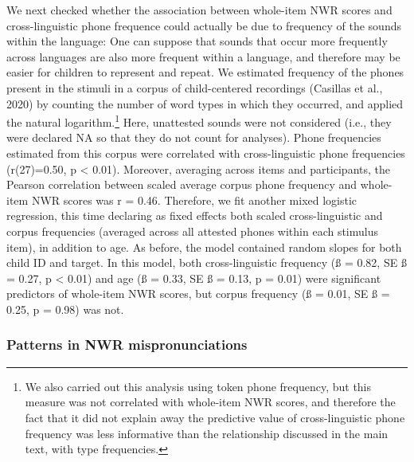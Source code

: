 \documentclass[english,,man,floatsintext]{apa6}
\begin{document}
We next checked whether the association between whole-item NWR scores and cross-linguistic phone frequence could actually be due to frequency of the sounds within the language: One can suppose that sounds that occur more frequently across languages are also more frequent within a language, and therefore may be easier for children to represent and repeat. We estimated frequency of the phones present in the stimuli in a corpus of child-centered recordings (Casillas et al., 2020) by counting the number of word types in which they occurred, and applied the natural logarithm.\footnote{We also carried out this analysis using token phone frequency, but this measure was not correlated with whole-item NWR scores, and therefore the fact that it did not explain away the predictive value of cross-linguistic phone frequency was less informative than the relationship discussed in the main text, with type frequencies.} Here, unattested sounds were not considered (i.e., they were declared NA so that they do not count for analyses). Phone frequencies estimated from this corpus were correlated with cross-linguistic phone frequencies (r(27)=0.50, p \textless{} 0.01). Moreover, averaging across items and participants, the Pearson correlation between scaled average corpus phone frequency and whole-item NWR scores was r = 0.46. Therefore, we fit another mixed logistic regression, this time declaring as fixed effects both scaled cross-linguistic and corpus frequencies (averaged across all attested phones within each stimulus item), in addition to age. As before, the model contained random slopes for both child ID and target. In this model, both cross-linguistic frequency (ß = 0.82, SE ß = 0.27, p \textless{} 0.01) and age (ß = 0.33, SE ß = 0.13, p = 0.01) were significant predictors of whole-item NWR scores, but corpus frequency (ß = 0.01, SE ß = 0.25, p = 0.98) was not.

\hypertarget{patterns-in-nwr-mispronunciations}{%
\subsubsection{Patterns in NWR mispronunciations}\label{patterns-in-nwr-mispronunciations}}
\end{document}
